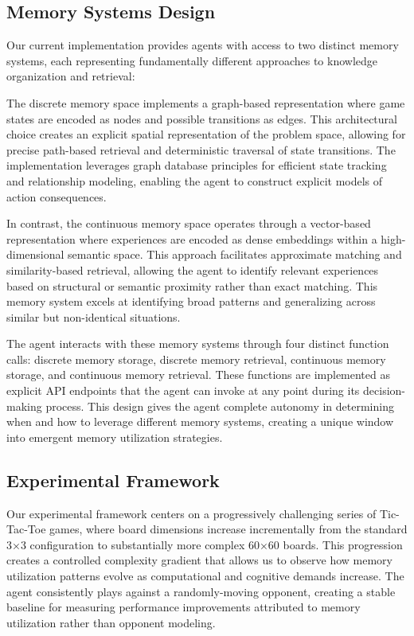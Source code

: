 \documentclass{article}
\begin{document}
\subsection{Memory Systems Design}

Our current implementation provides agents with access to two distinct memory systems, each representing fundamentally different approaches to knowledge organization and retrieval:

The discrete memory space implements a graph-based representation where game states are encoded as nodes and possible transitions as edges. This architectural choice creates an explicit spatial representation of the problem space, allowing for precise path-based retrieval and deterministic traversal of state transitions. The implementation leverages graph database principles for efficient state tracking and relationship modeling, enabling the agent to construct explicit models of action consequences.

In contrast, the continuous memory space operates through a vector-based representation where experiences are encoded as dense embeddings within a high-dimensional semantic space. This approach facilitates approximate matching and similarity-based retrieval, allowing the agent to identify relevant experiences based on structural or semantic proximity rather than exact matching. This memory system excels at identifying broad patterns and generalizing across similar but non-identical situations.

The agent interacts with these memory systems through four distinct function calls: discrete memory storage, discrete memory retrieval, continuous memory storage, and continuous memory retrieval. These functions are implemented as explicit API endpoints that the agent can invoke at any point during its decision-making process. This design gives the agent complete autonomy in determining when and how to leverage different memory systems, creating a unique window into emergent memory utilization strategies.

\subsection{Experimental Framework}

Our experimental framework centers on a progressively challenging series of Tic-Tac-Toe games, where board dimensions increase incrementally from the standard 3×3 configuration to substantially more complex 60×60 boards. This progression creates a controlled complexity gradient that allows us to observe how memory utilization patterns evolve as computational and cognitive demands increase. The agent consistently plays against a randomly-moving opponent, creating a stable baseline for measuring performance improvements attributed to memory utilization rather than opponent modeling.
\end{document}
